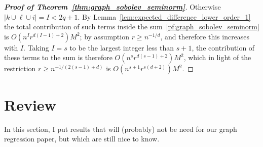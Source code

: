 \documentclass{article}
\newcommand{\abs}[1]{\left \lvert #1 \right \rvert}
\newcommand{\1}{\mathbf{1}}
\theoremstyle{alden}
\theoremstyle{aldenthm}
\theoremstyle{definition}
\theoremstyle{remark}
\begin{document}
\begin{proof}[\textbf{Proof of Theorem~\ref{thm:graph_sobolev_seminorm}}]
	Otherwise $\abs{k \cup \ell \cup i} = I < 2q + 1$. By Lemma~\ref{lem:expected_difference_lower_order_1} the total contribution of such terms inside the sum~\eqref{pf:graph_sobolev_seminorm} is $O(n^{I}r^{d(I - 1) + 2}) M^2$; by assumption $r \geq n^{-1/d}$, and therefore this increases with $I$. Taking $I = s$ to be the largest integer less than $s + 1$, the contribution of these terms to the sum is therefore $O(n^sr^{d(s - 1) + 2})M^2$, which in light of the restriction $r \geq n^{-1/(2(s - 1) + d)}$ is $O(n^{s+1}r^{s(d +2)})M^2$.
\end{proof}

\section{Review}
In this section, I put results that will (probably) not be need for our graph regression paper, but which are still nice to know.
\end{document}
